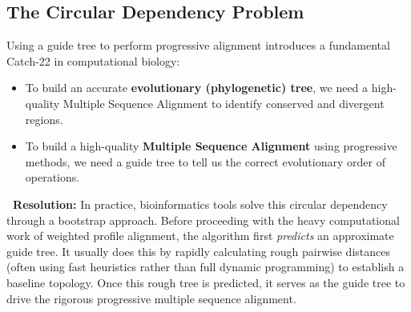 \documentclass[11pt, a4paper]{article}
\newcommand{\sta}{\textbf{\sffamily [CRITICAL / EXAM]\ }}
\begin{document}
\subsection{The Circular Dependency Problem}

Using a guide tree to perform progressive alignment introduces a fundamental Catch-22 in computational biology:
\begin{itemize}
    \item To build an accurate \textbf{evolutionary (phylogenetic) tree}, we need a high-quality Multiple Sequence Alignment to identify conserved and divergent regions.
    \item To build a high-quality \textbf{Multiple Sequence Alignment} using progressive methods, we need a guide tree to tell us the correct evolutionary order of operations.
\end{itemize}

\sta \textbf{Resolution:} In practice, bioinformatics tools solve this circular dependency through a bootstrap approach. Before proceeding with the heavy computational work of weighted profile alignment, the algorithm first \textit{predicts} an approximate guide tree. It usually does this by rapidly calculating rough pairwise distances (often using fast heuristics rather than full dynamic programming) to establish a baseline topology. Once this rough tree is predicted, it serves as the guide tree to drive the rigorous progressive multiple sequence alignment.
\end{document}
